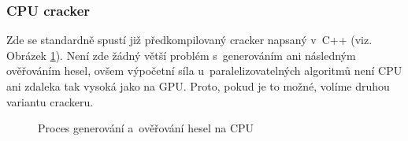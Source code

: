 \subsubsection{CPU cracker}
Zde se standardně spustí již předkompilovaný cracker napsaný v~C++ (viz. Obrázek \ref{CPU}). Není
zde žádný větší problém s~generováním ani následným ověřováním hesel, ovšem výpočetní síla
u~paralelizovatelných algoritmů není CPU ani zdaleka tak vysoká jako na GPU. Proto, pokud je to
možné, volíme druhou variantu crackeru.
\begin{figure}[ht]
    \begin{center}
    \end{center}
    \caption{Proces generování a~ověřování hesel na CPU \cite{Schmied}}
    \label{CPU}
\end{figure}


